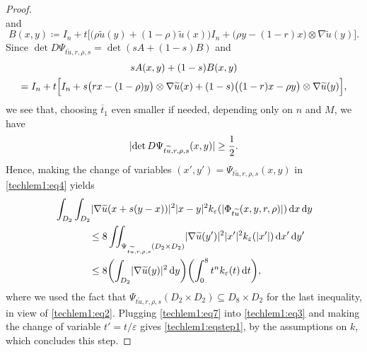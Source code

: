 \documentclass[JEP,XML,SOM,Unicode,published]{cedram}
\numberwithin{equation}{section}
\theoremstyle{plain}
\theoremstyle{definition}
\newcommand{\dx}{\mathop{}\mathopen{}\mathrm{d}x}
\newcommand{\dy}{\mathop{}\mathopen{}\mathrm{d}y}
\newcommand{\dt}{\mathop{}\mathopen{}\mathrm{d}t}
\let\eps\varepsilon
\let\ol\overline
\let\wt\widetilde
\newcommand{\grad}{\nabla}
\newcommand{\subsq}{\subseteq}
\DeclarePairedDelimiter{\abs}{\lvert}{\rvert}
\begin{document}
\begin{proof}
\[\]
and
\[
B(x,y)\coloneqq I_n+t\Big[\big(\rho \wt{u}(y)+(1-\rho)\wt{u}(x)\big)I_n+\big(\rho
y-(1-r)x\big)\otimes \grad \wt{u}(y)\Big].
\]
Since $\det D\Psi_{t\wt{u},r,\rho,s}=\det(sA+(1-s)B)$ and\vspace*{-5pt}
\begin{multline*}
sA(x,y)+(1-s)B(x,y)\\
=I_n+t\Bigl[I_n+s\big(rx-(1-\rho)y\big)\otimes\grad \wt{u}(x)+(1-s)\big((1-r)x-\rho
y\big)\otimes\grad\wt{u}(y)\Bigr],
\end{multline*}
we see that, choosing $\ol{t}_1$ even smaller if needed, depending only on $n$ and $M$, we have
\[
\abs{\det D\Psi_{t\wt{u},r,\rho,s}(x,y)}\geq \frac{1}{2}.
\]
Hence, making the change of variables $(x',y')=\Psi_{t\wt{u},r,\rho,s}(x,y)$ in \cref{techlem1:eq4}
yields
\begin{equation}\label{techlem1:eq7}
\begin{aligned}
&\int_{D_2}\int_{D_2} \abs{\grad\wt{u}(x+s(y-x))}^2 \abs{x-y}^2
k_\eps(\abs{\Phi_{t\wt{u}}(x,y,r,\rho)})\dx\dy\\
&\hphantom{\int_{D_2}\int_{D_2}}
\leq 8 \iint_{\Psi_{t\wt{u},r,\rho,s}(D_2\times D_2)} \abs{\grad\wt{u}(y')}^2 \abs{x'}^2
k_\eps(\abs{x'})\dx'\dy'\\
&\hphantom{\int_{D_2}\int_{D_2}}
\leq 8 \biggl(\int_{D_2} \abs{\grad\wt{u}(y)}^2\dy\biggr)\biggl(\int_0^8 t^{n}k_\eps(t)\dt\biggr),
\end{aligned}
\end{equation}
where we used the fact that $\Psi_{t\wt{u},r,\rho,s}(D_2\times D_2)\subsq D_8\times D_2$ for
the last inequality, in view of \cref{techlem1:eq2}.
Plugging \cref{techlem1:eq7} into \cref{techlem1:eq3} and making the change of variable $t'=t/\eps$
gives \cref{techlem1:eqstep1}, by the assumptions on $k$, which concludes this step.


\end{proof}
\end{document}
